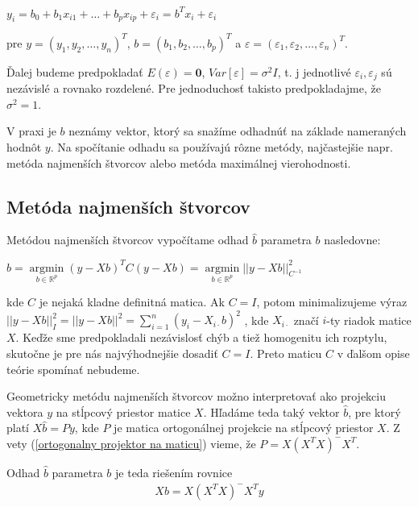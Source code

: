 \begin{center}
$
y_i = b_0 + b_1 x_{i1} + … + b_p x_{ip} + {\varepsilon}_i = b^T x_i + {\varepsilon}_i
$
\end{center}

pre $y = (y_1, y_2, \ldots, y_n)^T$, $b = (b_1, b_2, \ldots, b_p)^T$ a $\varepsilon = ({\varepsilon}_1, {\varepsilon}_2, \ldots, {\varepsilon}_n)^T$.

Ďalej budeme predpokladať $E(\varepsilon) = \textbf{0}$, $Var[\varepsilon] = {\sigma}^2 I$,
t. j jednotlivé ${\varepsilon}_i, {\varepsilon}_j$ sú nezávislé a rovnako rozdelené.
Pre jednoduchosť takisto predpokladajme, že ${\sigma}^2 = 1$.

V praxi je $b$ neznámy vektor, ktorý sa snažíme odhadnúť na základe nameraných hodnôt $y$.
Na spočítanie odhadu sa používajú rôzne metódy, najčastejšie napr. metóda najmenších štvorcov alebo metóda maximálnej vierohodnosti.

\subsection{Metóda najmenších štvorcov}

Metódou najmenších štvorcov vypočítame odhad $\hat{b}$ parametra $b$ nasledovne:

\begin{center}
$
\hat{b} = \underset{b \in \mathbb{R}^{p}}{\operatorname{arg min}} (y - Xb)^T C (y - Xb) =
\underset{b \in \mathbb{R}^{p}}{\operatorname{arg min}} ||y - Xb||_{C^{-1}}^2
$
\end{center}

kde $C$ je nejaká kladne definitná matica. 
Ak $C = I$, potom minimalizujeme výraz
$||y - Xb||_I^2 = ||y - Xb||^2 = \sum_{i=1}^n (y_i - X_{i \cdot } b)^2$
, kde $X_{i \cdot }$ značí $i$-ty riadok matice $X$.
Keďže sme predpokladali nezávislosť chýb a tiež homogenitu ich rozptylu, skutočne je pre nás najvýhodnejšie dosadiť $C = I$.
Preto maticu $C$ v ďalšom opise teórie spomínať nebudeme.

Geometricky metódu najmenších štvorcov možno interpretovať ako projekciu vektora $y$ 
na stĺpcový priestor matice $X$. Hľadáme teda taký vektor $\hat{b}$, 
pre ktorý platí $X \hat{b} = Py$, kde $P$ je matica ortogonálnej projekcie na stĺpcový priestor $X$. 
Z vety (\ref{ortogonalny projektor na maticu}) vieme, že $P = X (X^T X)^- X^T$.

Odhad $\hat{b}$ parametra $b$ je teda riešením rovnice
\begin{align}
\label{least squares solution}
X b =  X (X^T X)^- X^T y
\end{align}

